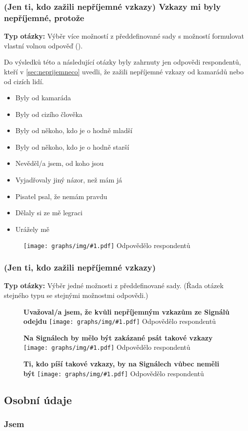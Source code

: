 \documentclass[12pt, a4paper, twoside]{article}
\newcommand{\answercount}[1]{Odpovědělo  respondentů}
\newcommand{\includegraph}[2]{
  \begin{figure}[H]
    \centering
    \textbf{#2}
    \texttt{[image: graphs/img/\#1.pdf]}
    \answercount{#1}
  \end{figure}
}
\newcommand{\qtype}{\textbf{Typ otázky:}
}
\newcommand{\pickOne}{Výběr jedné možnosti z předdefinované sady\xspace}
\newcommand{\pickMultiple}{Výběr více možností z předdefinované sady\xspace}
\newcommand{\withOther}{s možností formulovat vlastní volnou odpověď (\uv{Jiné})\xspace}
\newcommand{\series}{(Řada otázek stejného typu se stejnými možnostmi odpovědi.)\xspace}
\begin{document}
\subsubsection{(Jen ti, kdo zažili nepříjemné vzkazy) Vzkazy mi byly nepříjemné, protože}

\qtype \pickMultiple \withOther.

Do výsledků této a následující otázky byly zahrnuty
jen odpovědi respondentů,
kteří v \ref{sec:neprijemneco} uvedli, že zažili nepříjemné vzkazy
od kamarádů nebo od cizích lidí.

\begin{itemize}
\item Byly od kamaráda
\item Byly od cizího člověka
\item Byly od někoho, kdo je o hodně mladší
\item Byly od někoho, kdo je o hodně starší
\item Nevěděl/a jsem, od koho jsou
\item Vyjadřovaly jiný názor, než mám já
\item Pisatel psal, že nemám pravdu
\item Dělaly si ze mě legraci
\item Urážely mě
\end{itemize}

\includegraph{neprijemne_vzkazy_protoze}{}

\subsubsection{(Jen ti, kdo zažili nepříjemné vzkazy)}

\qtype \pickOne. \series

\includegraph{neprijemne_vzkazy_zvazoval_odchod}{Uvažoval/a jsem, že kvůli nepříjemným vzkazům ze Signálů odejdu}

\includegraph{neprijemne_vzkazy_zakazat}{Na Signálech by mělo být zakázané psát takové vzkazy}

\includegraph{neprijemne_vzkazy_pisatele_pryc}{Ti, kdo píší takové vzkazy, by na Signálech vůbec neměli být}

\subsection{Osobní údaje}\label{sec:osobni}

\subsubsection{Jsem}
\end{document}
